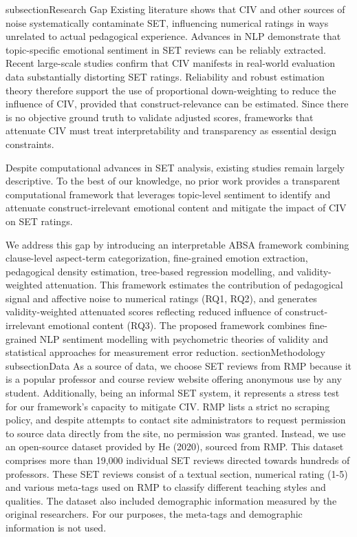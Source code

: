 subsection{Research Gap}
Existing literature shows that CIV and other sources of noise systematically contaminate SET, influencing numerical ratings in ways unrelated to actual pedagogical experience. Advances in NLP demonstrate that topic-specific emotional sentiment in SET reviews can be reliably extracted. Recent large-scale studies confirm that CIV manifests in real-world evaluation data substantially distorting SET ratings. Reliability and robust estimation theory therefore support the use of proportional down-weighting to reduce the influence of CIV, provided that construct-relevance can be estimated. Since there is no objective ground truth to validate adjusted scores, frameworks that attenuate CIV must treat interpretability and transparency as essential design constraints.

Despite computational advances in SET analysis, existing studies remain largely descriptive. To the best of our knowledge, no prior work provides a transparent computational framework that leverages topic-level sentiment to identify and attenuate construct-irrelevant emotional content and mitigate the impact of CIV on SET ratings.

We address this gap by introducing an interpretable ABSA framework combining clause-level aspect-term categorization, fine-grained emotion extraction, pedagogical density estimation, tree-based regression modelling, and validity-weighted attenuation. This framework estimates the contribution of pedagogical signal and affective noise to numerical ratings (RQ1, RQ2), and generates validity-weighted attenuated scores reflecting reduced influence of construct-irrelevant emotional content (RQ3). The proposed framework combines fine-grained NLP sentiment modelling with psychometric theories of validity and statistical approaches for measurement error reduction.
section{Methodology}
subsection{Data}
As a source of data, we choose SET reviews from RMP because it is a popular professor and course review website offering anonymous use by any student. Additionally, being an informal SET system, it represents a stress test for our framework's capacity to mitigate CIV. RMP lists a strict no scraping policy, and despite attempts to contact site administrators to request permission to source data directly from the site, no permission was granted. Instead, we use an open-source dataset provided by He (2020), sourced from RMP. This dataset comprises more than 19,000 individual SET reviews directed towards hundreds of professors. These SET reviews consist of a textual section, numerical rating (1-5) and various meta-tags used on RMP to classify different teaching styles and qualities. The dataset also included demographic information measured by the original researchers. For our purposes, the meta-tags and demographic information is not used.

